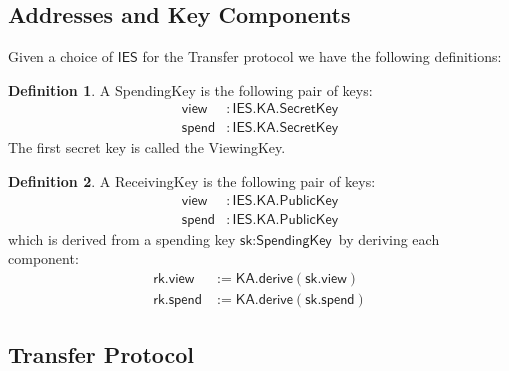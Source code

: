 \documentclass[a4paper]{article}
\newcommand{\lsubsection}[2]{\def\sectionlabel{#2} \subsection{#1}\label{sec:#2}}
\theoremstyle{definition}
\newtheorem{definition}{Definition}[subsection]
\newcommand{\IES}{{\textsf{IES}}}
\newcommand{\KA}{{\textsf{KA}}}
\newcommand{\PublicKey}{{\textsf{PublicKey}}}
\newcommand{\ReceivingKey}{{\textsf{ReceivingKey}}}
\newcommand{\SecretKey}{{\textsf{SecretKey}}}
\newcommand{\SpendingKey}{{\textsf{SpendingKey}}}
\newcommand{\Transfer}{{\textsf{Transfer}}}
\newcommand{\ViewingKey}{{\textsf{ViewingKey}}}
\newcommand{\derive}{{\textsf{derive}}}
\newcommand{\rk}{{\textsf{rk}}}
\newcommand{\sk}{{\textsf{sk}}}
\newcommand{\spend}{{\textsf{spend}}}
\newcommand{\view}{{\textsf{view}}}
\begin{document}
\lsubsection{Addresses and Key Components}{addresses-and-key-components}

Given a choice of $\IES$ for the \Transfer{} protocol we have the following definitions:

\begin{definition}
    A \SpendingKey{} is the following pair of keys:
    \begin{align*}
        \view  &: \IES.\KA.\SecretKey \\
        \spend &: \IES.\KA.\SecretKey
    \end{align*}
    The first secret key is called the \ViewingKey{}.
\end{definition}

\begin{definition}
    A \ReceivingKey{} is the following pair of keys:
    \begin{align*}
        \view  &: \IES.\KA.\PublicKey \\
        \spend &: \IES.\KA.\PublicKey
    \end{align*}
    which is derived from a spending key $\sk : \SpendingKey$ by deriving each component:
    \begin{align*}
        \rk.\view &:= \KA.\derive(\sk.\view) \\
        \rk.\spend   &:= \KA.\derive(\sk.\spend)
    \end{align*}
\end{definition}

\lsubsection{\Transfer{} Protocol}{transfer-protocol}
\end{document}
